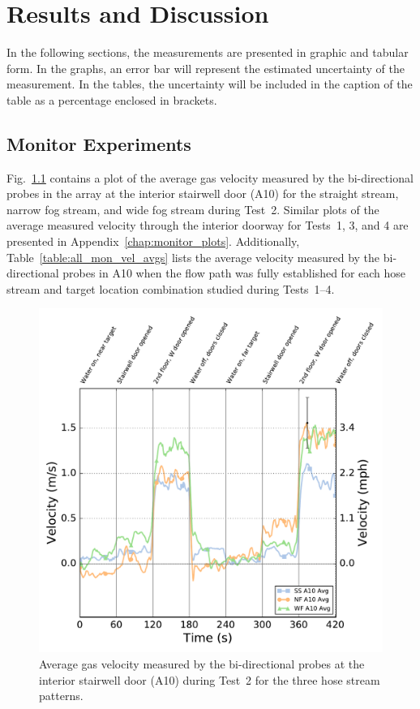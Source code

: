 \documentclass[12pt,oneside]{book}
\begin{document}

\chapter{Results and Discussion}
\label{chap:results}
In the following sections, the measurements are presented in graphic and tabular form. In the graphs, an error bar will represent the estimated uncertainty of the measurement. In the tables, the uncertainty will be included in the caption of the table as a percentage enclosed in brackets.

\section{Monitor Experiments}
\label{sec:monitor_results}
Fig.~\ref{fig:Test_2_BDP_A10_Avg_All} contains a plot of the average gas velocity measured by the bi-directional probes in the array at the interior stairwell door (A10) for the straight stream, narrow fog stream, and wide fog stream during Test~2. Similar plots of the average measured velocity through the interior doorway for Tests~1, 3, and 4 are presented in Appendix~\ref{chap:monitor_plots}. Additionally, Table~\ref{table:all_mon_vel_avgs} lists the average velocity measured by the bi-directional probes in A10 when the flow path was fully established for each hose stream and target location combination studied during Tests~1--4.

\begin{figure}[!ht]
	\includegraphics[width=\columnwidth]{../Figures/Plots/Test_16_West_063014_BDP_A10_stream_avgs}
	\caption[Average gas velocity through the interior stairwell door during Test~2 for the three hose stream patterns.]{Average gas velocity measured by the bi-directional probes at the interior stairwell door (A10) during Test~2 for the three hose stream patterns.}
	\label{fig:Test_2_BDP_A10_Avg_All}
\end{figure}
\end{document}

